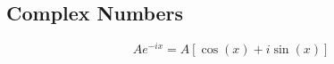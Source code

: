 \subsection{Complex Numbers}
	\begin{equation} \label{eq:Exponential to Rectangular}
		A e^{-ix} = A \left[ \cos \left( x \right) + i\sin \left( x \right) \right]
	\end{equation}
